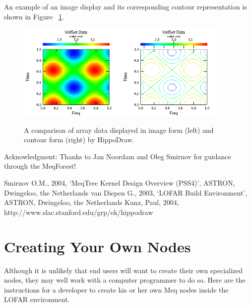 \documentclass[10pt]{article}
\begin{document}
An example of an image display and its corresponding contour representation is
shown in Figure ~\ref{fig:comparison}.


\begin{figure}
\begin{center}
\includegraphics[width=2in]{Figures/image_display}
\includegraphics[width=2in]{Figures/contour_display}
\end{center}
\caption {A comparison of array data displayed in image form (left) 
and contour form (right) by HippoDraw.}
\label{fig:comparison}
\end{figure}

\vspace{1.0cm}                         
Acknowledgment: Thanks to Jan Noordam and Oleg Smirnov for guidance through 
the MeqForest!

\begin{thebibliography}{}
 Smirnov O.M., 2004, `MeqTree Kernel Design Overview (PSS4)',
ASTRON, Dwingeloo, the Netherlands
 van Diepen G., 2003, `LOFAR Build Environment',
ASTRON, Dwingeloo, the Netherlands
 Kunz, Paul, 2004, http://www.slac.stanford.edu/grp/ek/hippodraw
\end{thebibliography}
 

\section{Creating Your Own Nodes }

Although it is unlikely that end users will want to create their
own specialized nodes, they may well work with a computer 
programmer to do so. Here are the instructions for a developer
to create his or her own Meq nodes inside the LOFAR environment.
\end{document}
